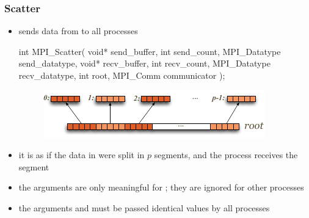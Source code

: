 \begin{frame}[fragile]
%
  \frametitle{Scatter}
%
  \begin{itemize}
%
  \item {} sends data from  to all processes 
    \begin{C}
int MPI_Scatter(
        void* send_buffer, int send_count, MPI_Datatype send_datatype,
        void* recv_buffer, int recv_count, MPI_Datatype recv_datatype,
        int root, MPI_Comm communicator
        );
    \end{C}
    \begin{figure}
      \centering
      \includegraphics[scale=1.0]{figures/mpi-scatter.pdf}
    \end{figure}
%
  \item it is as if the data in  were split in $p$ segments, and the
     process receives the  segment
%
  \item the  arguments are only meaningful for ; they
    are ignored for other processes
%
  \item the arguments  and  must be passed identical
    values by all processes
%
  \end{itemize}
% 
\end{frame}

